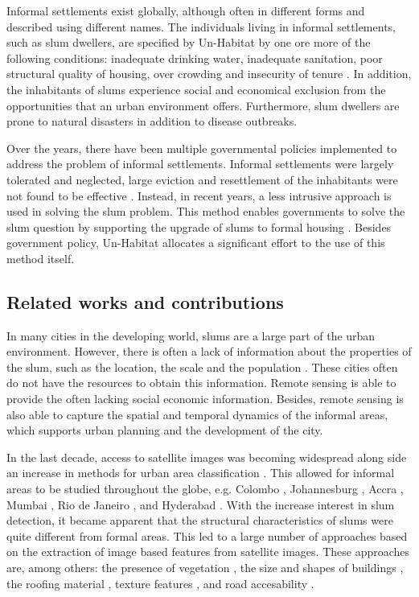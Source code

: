 Informal settlements exist globally, although often in different forms and described using different names. The individuals living in informal settlements, such as slum dwellers, are specified by Un-Habitat by one ore more of the following conditions: inadequate  drinking  water,  inadequate  sanitation, poor  structural quality of housing, over crowding and insecurity of tenure \cite{un2015slum}. In addition, the inhabitants of slums experience social and economical exclusion from the opportunities that an urban environment offers. Furthermore, slum dwellers are prone to natural disasters in addition to disease outbreaks. 

Over the years, there have been multiple governmental policies implemented to address the problem of informal settlements. Informal settlements were largely tolerated and neglected, large eviction and resettlement of the inhabitants were not found to be effective \cite{kuffer2016slums}. Instead, in recent years, a less intrusive approach is used in solving the slum problem. This method enables governments to solve the slum question by supporting the upgrade of slums to formal housing \cite{cobbett2013cities}. Besides government policy, Un-Habitat allocates a significant effort to the use of this method itself\cite{2015globact}.

\subsection{Related works and contributions}
In many cities in the developing world, slums are a large part of the urban environment. However, there is often a lack of information about the properties of the slum, such as the location, the scale and the population \cite{kuffer2016slums}. These cities often do not have the resources to obtain this information. Remote sensing is able to provide the often lacking  social economic information. Besides, remote sensing is also able to capture the spatial and temporal dynamics of the informal areas, which supports urban planning and the development of the city.

In the last decade, access to satellite images was becoming widespread along side an increase in methods for urban area classification \cite{kuffer2016slums}. This allowed for informal areas to be studied throughout the globe, e.g. Colombo \cite{colombo}, Johannesburg \cite{williams2016automatic}, Accra \cite{accra}, Mumbai \cite{mumbai}, Rio de Janeiro \cite{hofmann2008detecting}, and Hyderabad \cite{hyderabad}. With the increase interest in slum detection, it became apparent that the structural characteristics of slums were quite different from formal areas. This led to a large number of approaches based on the extraction of  image based features from satellite images. These approaches are, among others: the presence of vegetation \cite{niebergall2007object}, the size and shapes of buildings \cite{hofmann2008detecting}, the roofing material \cite{williams2016automatic}, texture features \cite{mattia2007exploiting}, and road accesability \cite{owen2013approach}.

